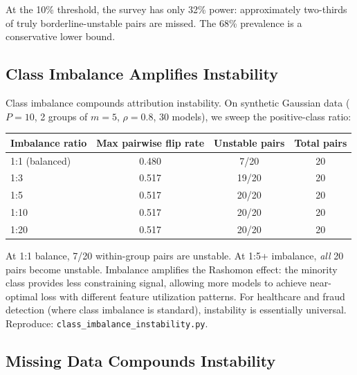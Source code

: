 \documentclass{article}
\begin{document}
At the 10\% threshold, the survey has only 32\% power: approximately two-thirds of truly borderline-unstable pairs are missed. The 68\% prevalence is a conservative lower bound.

\subsection{Class Imbalance Amplifies Instability}
\label{sec:class-imbalance}

Class imbalance compounds attribution instability. On synthetic Gaussian data ($P{=}10$, 2 groups of $m{=}5$, $\rho{=}0.8$, 30 models), we sweep the positive-class ratio:

\begin{center}
\small
\begin{tabular}{@{}lccc@{}}
\toprule
Imbalance ratio & Max pairwise flip rate\footnotemark & Unstable pairs & Total pairs \\
\midrule
1:1 (balanced)  & 0.480 & 7/20  & 20 \\
1:3             & 0.517 & 19/20 & 20 \\
1:5             & 0.517 & 20/20 & 20 \\
1:10            & 0.517 & 20/20 & 20 \\
1:20            & 0.517 & 20/20 & 20 \\
\bottomrule
\end{tabular}
\end{center}


At 1:1 balance, 7/20 within-group pairs are unstable. At 1:5+ imbalance, \emph{all} 20 pairs become unstable. Imbalance amplifies the Rashomon effect: the minority class provides less constraining signal, allowing more models to achieve near-optimal loss with different feature utilization patterns. For healthcare and fraud detection (where class imbalance is standard), instability is essentially universal.
Reproduce: \texttt{class\_imbalance\_instability.py}.

\subsection{Missing Data Compounds Instability}
\label{sec:missing-data}
\end{document}
